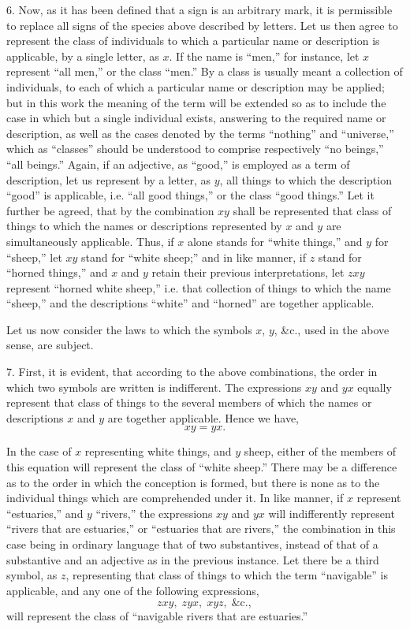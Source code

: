 \documentclass[oneside]{book}
\begin{document}
6. Now, as it has been defined that a sign is an arbitrary
mark, it is permissible to replace all signs of the species above
described by letters. Let us then agree to represent the class of
individuals to which a particular name or description is applicable,
by a single letter, as $x$. If the name is ``men,'' for instance,
let $x$ represent ``all men,'' or the class ``men.'' By a class is
usually meant a collection of individuals, to each of which a
particular name or description may be applied; but in this work
the meaning of the term will be extended so as to include the
case in which but a single individual exists, answering to the
required name or description, as well as the cases denoted by
the terms ``nothing'' and ``universe,'' which as ``classes''
should be understood to comprise respectively ``no beings,''
``all beings.'' Again, if an adjective, as ``good,'' is employed
as a term of description, let us represent by a letter, as $y$, all
things to which the description ``good'' is applicable, i.e. ``all
good things,'' or the class ``good things.'' Let it further be
agreed, that by the combination $xy$ shall be represented that
class of things to which the names or descriptions represented by
$x$ and $y$ are simultaneously applicable. Thus, if $x$ alone stands
for ``white things,'' and $y$ for ``sheep,'' let $xy$ stand for ``white
sheep;'' and in like manner, if $z$ stand for ``horned things,'' and
$x$ and $y$ retain their previous interpretations, let $zxy$ represent
``horned white sheep,'' i.e. that collection of things to which
the name ``sheep,'' and the descriptions ``white'' and ``horned''
are together applicable.

Let us now consider the laws to which the symbols $x$, $y$, \&c.,
used in the above sense, are subject.

7. First, it is evident, that according to the above combinations,
the order in which two symbols are written is indifferent.
The expressions $xy$ and $yx$ equally represent that class of things
to the several members of which the names or descriptions $x$ and
$y$ are together applicable. Hence we have,
\begin{equation}
xy=yx.
\end{equation}


In the case of $x$ representing white things, and $y$ sheep, either
of the members of this equation will represent the class of ``white
sheep.'' There may be a difference as to the order in which the
conception is formed, but there is none as to the individual things
which are comprehended under it. In like manner, if $x$ represent
``estuaries,'' and $y$ ``rivers,'' the expressions $xy$ and $yx$ will indifferently
represent ``rivers that are estuaries,'' or ``estuaries
that are rivers,'' the combination in this case being in ordinary
language that of two substantives, instead of that of a substantive
and an adjective as in the previous instance. Let there be a
third symbol, as $z$, representing that class of things to which the
term ``navigable'' is applicable, and any one of the following
expressions,
\[
zxy,\; zyx,\; xyz,\; \textrm{\&c.},
\]
will represent the class of ``navigable rivers that are estuaries.''
\end{document}

